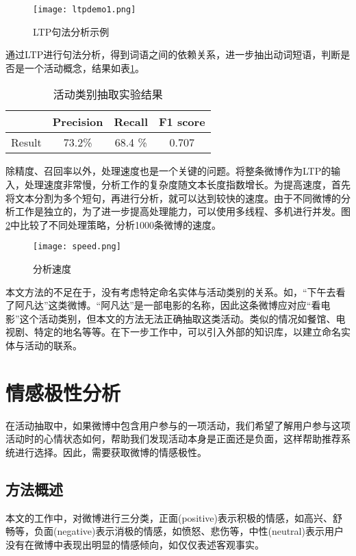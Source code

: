 \begin{figure}[!h]
\centering
\texttt{[image: ltpdemo1.png]}
\caption{LTP句法分析示例}
\label{fig:ltp_demo}
\end{figure}

通过LTP进行句法分析，得到词语之间的依赖关系，进一步抽出动词短语，判断是否是一个活动概念，结果如表\ref{table:cat_extraction}。

\begin{table}
\centering
\begin{tabular}{|c|c|c|c|}
\hline
& Precision & Recall & F1 score \\
\hline
Result & 73.2\% & 68.4 \% & 0.707 \\ 
\hline
\end{tabular}
\caption{活动类别抽取实验结果}
\label{table:cat_extraction}
\end{table}

除精度、召回率以外，处理速度也是一个关键的问题。将整条微博作为LTP的输入，处理速度非常慢，分析工作的复杂度随文本长度指数增长。为提高速度，首先将文本分割为多个短句，再进行分析，就可以达到较快的速度。由于不同微博的分析工作是独立的，为了进一步提高处理能力，可以使用多线程、多机进行并发。图\ref{fig:parse_speed}中比较了不同处理策略，分析1000条微博的速度。

\begin{figure}[!h]
\centering
\texttt{[image: speed.png]}
\caption{分析速度}
\label{fig:parse_speed}
\end{figure}

本文方法的不足在于，没有考虑特定命名实体与活动类别的关系。如，``下午去看了阿凡达''这类微博。``阿凡达''是一部电影的名称，因此这条微博应对应``看电影''这个活动类别，但本文的方法无法正确抽取这类活动。类似的情况如餐馆、电视剧、特定的地名等等。在下一步工作中，可以引入外部的知识库，以建立命名实体与活动的联系。

\section{情感极性分析}
在活动抽取中，如果微博中包含用户参与的一项活动，我们希望了解用户参与这项活动时的心情状态如何，帮助我们发现活动本身是正面还是负面，这样帮助推荐系统进行选择。因此，需要获取微博的情感极性。

\subsection{方法概述}
本文的工作中，对微博进行三分类，正面(positive)表示积极的情感，如高兴、舒畅等，负面(negative)表示消极的情感，如愤怒、悲伤等，中性(neutral)表示用户没有在微博中表现出明显的情感倾向，如仅仅表述客观事实。


